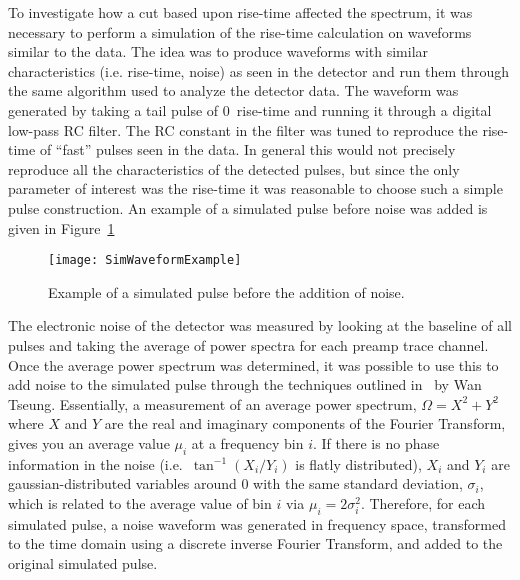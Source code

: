 	To investigate how a cut based upon rise-time affected the spectrum, it was necessary to perform a simulation of the rise-time calculation on waveforms similar to the data.  The idea was to produce waveforms with similar characteristics (i.e. rise-time, noise) as seen in the detector and run them through the same algorithm used to analyze the detector data.  The waveform was generated by taking a tail pulse of 0~rise-time and running it through a digital low-pass RC filter.  The RC constant in the filter was tuned to reproduce the rise-time of ``fast'' pulses seen in the data.  In general this would not precisely reproduce all the characteristics of the detected pulses, but since the only parameter of interest was the rise-time it was reasonable to choose such a simple pulse construction.  An example of a simulated pulse before noise was added is given in Figure~\ref{fig:SimWaveformExample}
				\begin{figure}
					\centering
					\texttt{[image: SimWaveformExample]}
					\caption[Example of a simulated pulse before the addition of noise]
					{Example of a simulated pulse before the addition of noise.}
					\label{fig:SimWaveformExample}
				\end{figure}
	
	The electronic noise of the detector was measured by looking at the baseline of all pulses and taking the average of power spectra for each preamp trace channel.  Once the average power spectrum was determined, it was possible to use this to add noise to the simulated pulse through the techniques outlined in~\cite{WanThesis08} by Wan Tseung.  Essentially, a measurement of an average power spectrum, $\Omega = X^{2} + Y^{2}$ where $X$ and $Y$ are the real and imaginary components of the Fourier Transform, gives you an average value $\mu_{i}$ at a frequency bin $i$.  If there is no phase information in the noise (i.e.~$\tan^{-1} (X_{i}/Y_{i})$ is flatly distributed), $X_{i}$ and $Y_{i}$ are gaussian-distributed variables around 0 with the same standard deviation, $\sigma_{i}$, which is related to the average value of bin $i$ via  $\mu_{i} = 2 \sigma_{i}^{2}$.  Therefore, for each simulated pulse, a noise waveform was generated in frequency space, transformed to the time domain using a discrete inverse Fourier Transform, and added to the original simulated pulse.  
	
